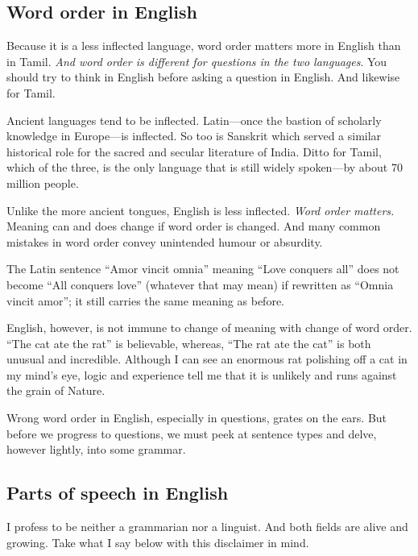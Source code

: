 \documentclass[
  12pt,
  a4paper,
]{article}
\begin{document}
\hypertarget{word-order-in-english}{%
\subsection{Word order in English}\label{word-order-in-english}}

Because it is a less inflected language, word order matters more in
English than in Tamil. \emph{And word order is different for questions
in the two languages}. You should try to think in English before asking
a question in English. And likewise for Tamil.

Ancient languages tend to be inflected. Latin---once the bastion of
scholarly knowledge in Europe---is inflected. So too is Sanskrit which
served a similar historical role for the sacred and secular literature
of India. Ditto for Tamil, which of the three, is the only language that
is still widely spoken---by about 70 million people.

Unlike the more ancient tongues, English is less inflected. \emph{Word
order matters.} Meaning can and does change if word order is changed.
And many common mistakes in word order convey unintended humour or
absurdity.

The Latin sentence ``Amor vincit omnia'' meaning ``Love conquers all''
does not become ``All conquers love'' (whatever that may mean) if
rewritten as ``Omnia vincit amor''; it still carries the same meaning as
before.

English, however, is not immune to change of meaning with change of word
order. ``The cat ate the rat'' is believable, whereas, ``The rat ate the
cat'' is both unusual and incredible. Although I can see an enormous rat
polishing off a cat in my mind's eye, logic and experience tell me that
it is unlikely and runs against the grain of Nature.

Wrong word order in English, especially in questions, grates on the
ears. But before we progress to questions, we must peek at sentence
types and delve, however lightly, into some grammar.

\hypertarget{parts-of-speech-in-english}{%
\subsection{Parts of speech in
English}\label{parts-of-speech-in-english}}

I profess to be neither a grammarian nor a linguist. And both fields are
alive and growing. Take what I say below with this disclaimer in mind.
\end{document}
